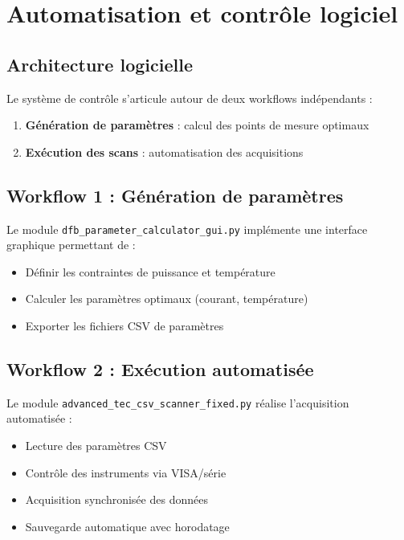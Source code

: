 \section{Automatisation et contrôle logiciel}

\subsection{Architecture logicielle}

Le système de contrôle s'articule autour de deux workflows indépendants :

\begin{enumerate}
    \item \textbf{Génération de paramètres} : calcul des points de mesure optimaux
    \item \textbf{Exécution des scans} : automatisation des acquisitions
\end{enumerate}

\subsection{Workflow 1 : Génération de paramètres}

Le module \texttt{dfb\_parameter\_calculator\_gui.py} implémente une interface graphique permettant de :
\begin{itemize}
    \item Définir les contraintes de puissance et température
    \item Calculer les paramètres optimaux (courant, température)
    \item Exporter les fichiers CSV de paramètres
\end{itemize}

\subsection{Workflow 2 : Exécution automatisée}

Le module \texttt{advanced\_tec\_csv\_scanner\_fixed.py} réalise l'acquisition automatisée :
\begin{itemize}
    \item Lecture des paramètres CSV
    \item Contrôle des instruments via VISA/série
    \item Acquisition synchronisée des données
    \item Sauvegarde automatique avec horodatage
\end{itemize}

